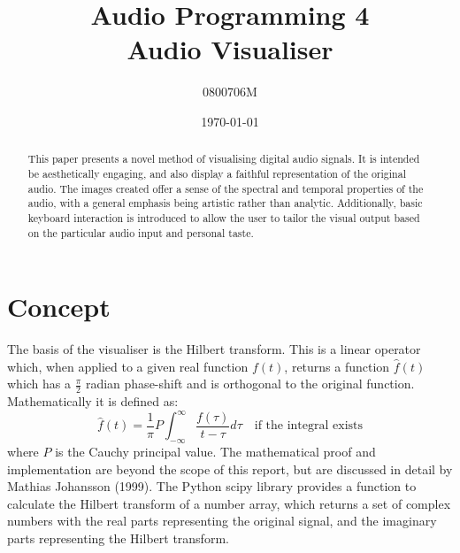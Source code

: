 \documentclass[11pt]{article}
\title{Audio Programming 4\\Audio Visualiser}
\author{0800706M}
\date{\today}
\begin{document}
\maketitle
\begin{abstract}
This paper presents a novel method of visualising digital audio signals. It is intended be aesthetically engaging, and also display a faithful representation of the original audio. The images created offer a sense of the spectral and temporal properties of the audio, with a general emphasis being artistic rather than analytic. Additionally, basic keyboard interaction is introduced to allow the user to tailor the visual output based on the particular audio input and personal taste.
\end{abstract}

\section{Concept}
The basis of the visualiser is the Hilbert transform. This is a linear operator which, when applied to a given real function $f(t)$, returns a function $\hat{f}(t)$ which has a $\frac{\pi}{2}$ radian phase-shift and is orthogonal to the original function. Mathematically it is defined as:
\begin{equation}
	\hat{f}(t) = \frac{1}{\pi}P\int_{-\infty}^{\infty}\frac{f(\tau)}{t-\tau}d\tau \quad \textrm{if the integral exists}
\end{equation}
where $P$ is the Cauchy principal value. The mathematical proof and implementation are beyond the scope of this report, but are discussed in detail by Mathias Johansson (1999)\cite{mj}. The Python scipy library provides a function to calculate the Hilbert transform of a number array, which returns a set of complex numbers with the real parts representing the original signal, and the imaginary parts representing the Hilbert transform.
\end{document}
